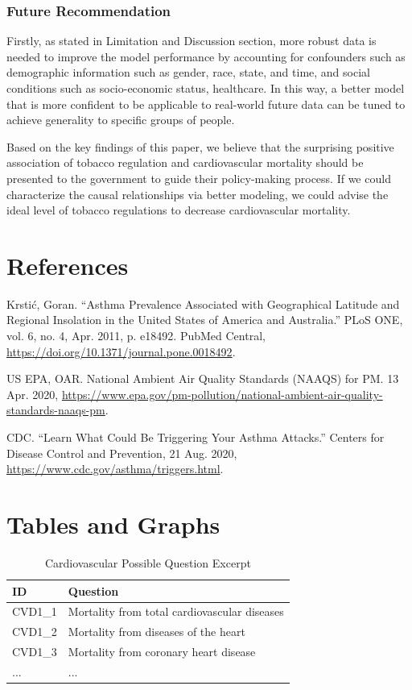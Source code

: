 \documentclass{article}
\begin{document}
\subsubsection{Future Recommendation}
Firstly, as stated in Limitation and Discussion section, more robust data is needed to improve the model performance by accounting for confounders such as demographic information such as gender, race, state, and time, and social conditions such as socio-economic status, healthcare. In this way, a better model that is more confident to be applicable to real-world future data can be tuned to achieve generality to specific groups of people.

Based on the key findings of this paper, we believe that the surprising positive association of tobacco regulation and cardiovascular mortality should be presented to the government to guide their policy-making process. If we could characterize the causal relationships via better modeling, we could advise the ideal level of tobacco regulations to decrease cardiovascular mortality.

\newpage
\appendix

\section{References}
Krstić, Goran. “Asthma Prevalence Associated with Geographical Latitude and Regional Insolation in the United States of America and Australia.” PLoS ONE, vol. 6, no. 4, Apr. 2011, p. e18492. PubMed Central, \href{https://www.ncbi.nlm.nih.gov/pmc/articles/PMC3072993/}{https://doi.org/10.1371/journal.pone.0018492}.


US EPA, OAR. National Ambient Air Quality Standards (NAAQS) for PM. 13 Apr. 2020, \href{https://www.ncbi.nlm.nih.gov/pmc/articles/PMC3072993/}{https://www.epa.gov/pm-pollution/national-ambient-air-quality-standards-naaqs-pm}.

CDC. “Learn What Could Be Triggering Your Asthma Attacks.” Centers for Disease Control and Prevention, 21 Aug. 2020, \href{https://www.cdc.gov/asthma/triggers.html}{https://www.cdc.gov/asthma/triggers.html}.


\section{Tables and Graphs}

\begin{table}[h]
\caption{\label{tab:questionIdTable}Cardiovascular Possible Question Excerpt}
\centering
\begin{tabular}{m|m}
ID & Question \\\hline
CVD1\_1 & Mortality from total cardiovascular diseases \\
CVD1\_2 & Mortality from diseases of the heart \\
CVD1\_3 & Mortality from coronary heart disease \\ 
... & ...
\end{tabular}
\end{table}
\end{document}
